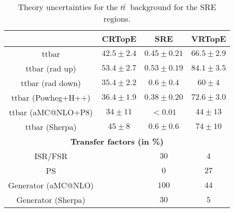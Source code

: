 \begin{description}
 \begin{table}[!h]
    \begin{center} \footnotesize
      \begin{tabular}{|c|c|c|c|}
        \hline
        & CRTopE & SRE & VRTopE\\
        \hline
        ttbar&   $42.5\pm 2.4 $&         $0.45\pm 0.21 $&        $66.5\pm 2.9 $\\
        ttbar (rad up)&          $53.4\pm 2.7 $&         $0.53\pm 0.19 $&        $84.1\pm 3.5 $\\
        ttbar (rad down)&        $35.4\pm 2.2 $&         $0.6\pm 0.4 $&          $60\pm 4 $\\
        ttbar (Powheg+H++)&      $36.4\pm 1.9 $&         $0.38\pm 0.20 $&        $72.6\pm 3.0 $\\
        ttbar (aMC@NLO+P8)&      $34\pm 11 $&    $<0.01$&        $44\pm 13 $\\
        ttbar (Sherpa)&          $45\pm 8 $&     $0.6\pm 0.6 $&          $74\pm 10 $\\
        \hline
        \multicolumn{4}{c}{\bf Transfer factors (in \%)} \\ \hline
        ISR/FSR &    &    $30$&   $4$\\
        PS &   &     $0$&   $27$\\
        Generator (aMC@NLO) & & $100$ & $44$\\
        Generator (Sherpa) & & $30$ & $5$\\        
        \hline       
        \end{tabular}
    \end{center}
    \caption{Theory uncertainties for the $t\bar{t}$\ background for the SRE regions.}
    \label{tab:ttbar_unc_SRE}
  \end{table}
 
 



\end{description}
